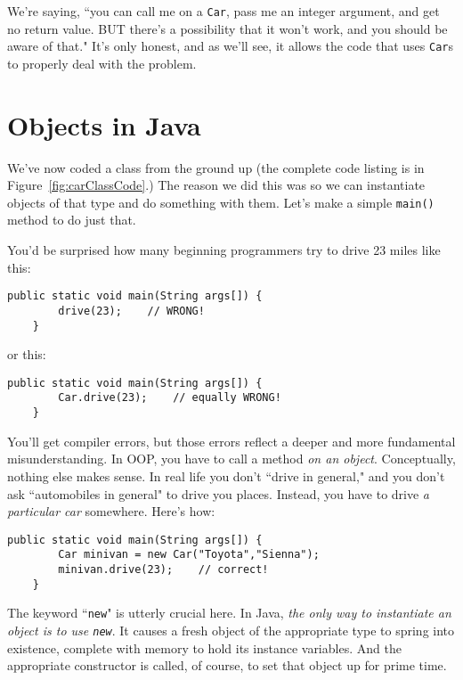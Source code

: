 We're saying, ``you can call me on a \texttt{Car}, pass me an integer
argument, and get no return value. BUT there's a possibility that it won't
work, and you should be aware of that." It's only honest, and as we'll see, it
allows the code that uses \texttt{Car}s to properly deal with the problem.



\section{Objects in Java}

We've now coded a class from the ground up (the complete code listing is in
Figure~\ref{fig:carClassCode}.) The reason we did this was so we can
instantiate objects of that type and do something with them. Let's make a
simple \texttt{main()} method to do just that.

You'd be surprised how many beginning programmers try to drive 23 miles like
this:

\begin{Verbatim}[samepage=true,fontsize=\scriptsize,frame=single]
    public static void main(String args[]) {
        drive(23);    // WRONG!
    }
\end{Verbatim}

or this:

\begin{Verbatim}[samepage=true,fontsize=\scriptsize,frame=single]
    public static void main(String args[]) {
        Car.drive(23);    // equally WRONG!
    }
\end{Verbatim}

You'll get compiler errors, but those errors reflect a deeper and more
fundamental misunderstanding. In OOP, you have to call a method \textit{on an
object}. Conceptually, nothing else makes sense. In real life you don't
``drive in general," and you don't ask ``automobiles in general" to drive you
places. Instead, you have to drive \textit{a particular car} somewhere. Here's
how:

\begin{Verbatim}[samepage=true,fontsize=\scriptsize,frame=single]
    public static void main(String args[]) {
        Car minivan = new Car("Toyota","Sienna");
        minivan.drive(23);    // correct!
    }
\end{Verbatim}

The keyword ``\texttt{new}" is utterly crucial here. In Java, \textit{the only
way to instantiate an object is to use \texttt{new}}. It causes a fresh object
of the appropriate type to spring into existence, complete with memory to hold
its instance variables. And the appropriate constructor is called, of course,
to set that object up for prime time.

